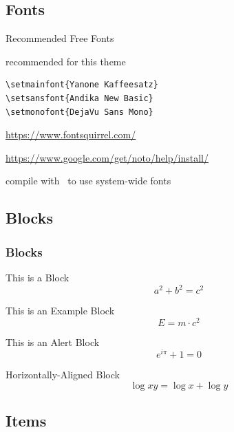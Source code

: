 \documentclass{article}
\begin{document}
\subsection{Fonts}

\begin{frame}[fragile]{Recommended Free Fonts}
  \begin{description}
  \item[Selected Fonts] recommended for this theme\\
    \begin{lstlisting}[basicstyle = \ttfamily\small]
\setmainfont{Yanone Kaffeesatz}
\setsansfont{Andika New Basic}
\setmonofont{DejaVu Sans Mono}
    \end{lstlisting}
  \item[Download] {\small \url{https://www.fontsquirrel.com/}}
  \item[Install Fonts] {\small \url{https://www.google.com/get/noto/help/install/}}
  \item[Compilation] compile with \XeLaTeX~to use system-wide fonts
  \end{description}

\end{frame}


\subsection{Blocks}

\begin{frame}
  \frametitle{Blocks}
  \begin{block}{This is a Block}
    \[
      a^2 + b^2 = c^2
    \]
  \end{block}
  \begin{exampleblock}{This is an Example Block}
    \[
      E = m \cdot c^{2}
    \]
  \end{exampleblock}
  \begin{alertblock}{This is an Alert Block}
    \[
      e^{i\pi} + 1 = 0
    \]
  \end{alertblock}

  \centering
  \begin{minipage}{1.0\linewidth}
    \begin{block}{Horizontally-Aligned Block}
      \[
        \log xy = \log x + \log y
      \]
    \end{block}
  \end{minipage}
\end{frame}

\subsection{Items}
\end{document}
